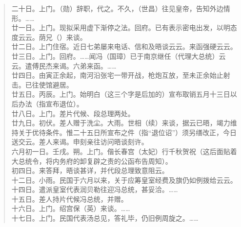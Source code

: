 \begin{quote}
	二十日。上门。（勋）辞职，代之。不久，（世昌）往见皇帝，告知外边情形。……\\

廿一日。上门。现拟采用虚下渐停之法。回府。已有表示密电出发，以明态度云云。荫兄（）来谈。\\

廿二日。上门住宿。近日七弟屡来电话、信和及晤谈云云。来函强硬云云。\\

廿三日。上门。回府。……闻冯（国璋）已于南京继任（代理大总统）云云。遣傅民杰来谒。六弟来函。……\\

廿四日。由寅正余起，南河沿张宅一带开战，枪炮互放，至未正余始止射击。已往使馆避居。\\

廿五日。丙辰。上门。始明白（这三个字是后加的）宣布取销五月十三日以后办法（指宣布退位）。\\

廿八日。上门。差片代候、段总理两处。\\

廿九日。初伏。差人赠于洗尘。大雨。世相（续）来谈，据云已晤，竭力维持关于优待条件。惟二十五日所宣布之件（指“退位诏”）须另缮改正，今日送交云。差人来谒。申刻亲往访问晤谈刻许。\\

六月初一日。壬戌。朔。上门。偕长春宫（太妃）行千秋贺祝（这后面贴着大总统令，将内务府的卸复辟之责的公函布告周知）。\\

初四日。来答拜，晤谈甚详，并代段总理致意阻云。\\

十二日。小雨。民国于六月以来，关于应筹皇室经费及旗仍如例拨给云云。\\

十四日。遣派皇室代表润贝勒往迎冯总统，甚妥洽。……\\

十五日。差人持片代候冯总统，并赠。\\

十六日。上门。绍宫保（英）来谈。……\\

十七日。上门。民国代表汤总见，答礼毕，仍旧例周旋之。……\\


\end{quote}
